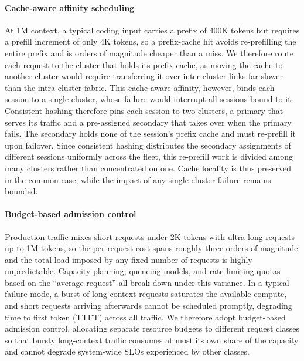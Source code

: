 \paragraph{Cache-aware affinity scheduling}
At 1M context, a typical coding input carries a prefix of 400K tokens but requires a prefill increment of only 4K tokens, so a prefix-cache hit avoids re-prefilling the entire prefix and is orders of magnitude cheaper than a miss.
We therefore route each request to the cluster that holds its prefix cache, as moving the cache to another cluster would require transferring it over inter-cluster links far slower than the intra-cluster fabric.
This cache-aware affinity, however, binds each session to a single cluster, whose failure would interrupt all sessions bound to it.
Consistent hashing therefore pins each session to two clusters, a primary that serves its traffic and a pre-assigned secondary that takes over when the primary fails.
The secondary holds none of the session's prefix cache and must re-prefill it upon failover.
Since consistent hashing distributes the secondary assignments of different sessions uniformly across the fleet, this re-prefill work is divided among many clusters rather than concentrated on one.
Cache locality is thus preserved in the common case, while the impact of any single cluster failure remains bounded.

\paragraph{Budget-based admission control}
Production traffic mixes short requests under 2K tokens with ultra-long requests up to 1M tokens, so the per-request cost spans roughly three orders of magnitude and the total load imposed by any fixed number of requests is highly unpredictable.
Capacity planning, queueing models, and rate-limiting quotas based on the ``average request'' all break down under this variance.
In a typical failure mode, a burst of long-context requests saturates the available compute, and short requests arriving afterwards cannot be scheduled promptly, degrading time to first token (TTFT) across all traffic.
We therefore adopt budget-based admission control, allocating separate resource budgets to different request classes so that bursty long-context traffic consumes at most its own share of the capacity and cannot degrade system-wide SLOs experienced by other classes.